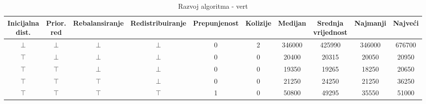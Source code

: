 \documentclass[times, utf8, zavrsni]{fer}
\begin{document}
\begin{table}
  \caption{Razvoj algoritma - horizont}
  \label{tbl:razvoj}
  \centering
\end{table}

\begin{sidewaystable}
  \caption{Razvoj algoritma - vert}
  \label{tbl:razvoj_v}
  \centering
  \begin{tabular}{c | c | c | c | c | c | c | c | c | c  }
    Inicijalna dist. & Prior. red & Rebalansiranje & Redistribuiranje &  Prepunjenost & Kolizije & Medijan & Srednja vrijednost & Najmanji & Najveći \\ \hline
    $\bot$ & $\bot$ & $\bot$ & $\bot$ & 0 & 2 & 346000 & 425990 & 346000 & 676700 \\ \hline
    $\top$ & $\bot$ & $\bot$ & $\bot$ & 0 & 0 & 20400 & 20315 & 20050 & 20950 \\ \hline
    $\top$ & $\top$ & $\bot$ & $\bot$ & 0 & 0 & 19350 & 19265 & 18250 & 20650 \\ \hline
    $\top$ & $\top$ & $\top$ & $\bot$ & 0 & 0 & 21250 & 24250 & 21250 & 36250 \\ \hline
    $\top$ & $\top$ & $\top$ & $\top$ & 1 & 0 & 50800 & 49295 & 35550 & 51000
  \end{tabular}
\end{sidewaystable}
\end{document}
